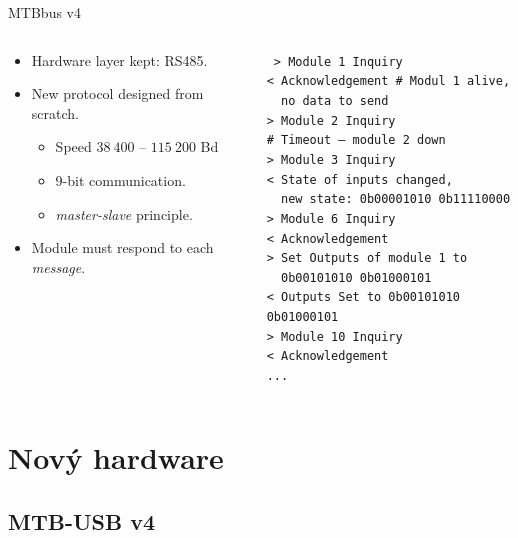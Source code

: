 \documentclass[aspectratio=169]{beamer}
\begin{document}
\begin{frame}{MTBbus v4}
\begin{columns}
	\begin{column}{.5\textwidth}
		\begin{itemize}
		\item Hardware layer kept: RS485.
		\item New protocol designed from scratch.
		\begin{itemize}
			\item Speed $38\ 400$ – $115\ 200$ Bd
			\item 9-bit communication.
			\item \textit{master-slave} principle.
		\end{itemize}
		\item Module must respond to each \textit{message}.
		\end{itemize}
	\end{column}
	\pause
	\begin{column}{.5\textwidth}\texttt{\footnotesize
> Module 1 Inquiry \\
< Acknowledgement  \# Modul 1 alive, \\
  no data to send \\
> Module 2 Inquiry \\
\# Timeout – module 2 down \\
> Module 3 Inquiry \\
< State of inputs changed, \\
  new state: 0b00001010 0b11110000 \\
> Module 6 Inquiry \\
< Acknowledgement \\
> Set Outputs of module 1 to\\
  0b00101010 0b01000101 \\
< Outputs Set to 0b00101010 0b01000101 \\
> Module 10 Inquiry \\
< Acknowledgement \\
...}
	\end{column}
\end{columns}
\end{frame}


\section{Nový hardware}
\subsection{MTB-USB v4}
\end{document}
